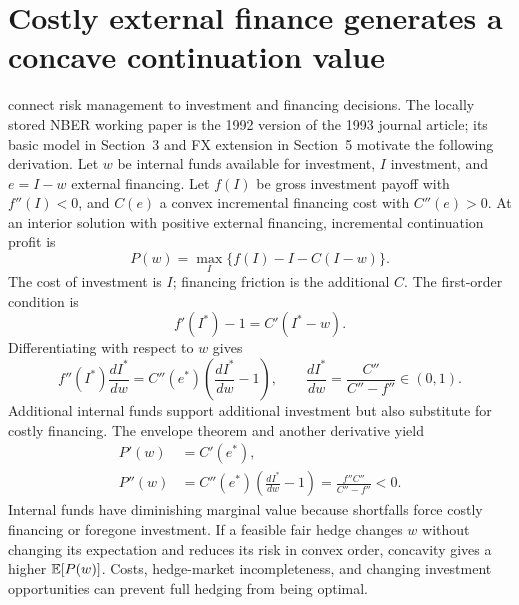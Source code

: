 \section{Costly external finance generates a concave continuation value}
\label{sec:froot}
\citet{froot1993} connect risk management to investment and financing decisions. The locally stored NBER working paper is the 1992 version of the 1993 journal article; its basic model in Section~3 and FX extension in Section~5 motivate the following derivation. Let $w$ be internal funds available for investment, $I$ investment, and $e=I-w$ external financing. Let $f(I)$ be gross investment payoff with $f''(I)<0$, and $C(e)$ a convex incremental financing cost with $C''(e)>0$. At an interior solution with positive external financing, incremental continuation profit is
\begin{equation}
P(w)=\max_I\{f(I)-I-C(I-w)\}.
\label{eq:frootvalue}
\end{equation}
The cost of investment is $I$; financing friction is the additional $C$. The first-order condition is
\begin{equation}
f'(I^*)-1=C'(I^*-w).
\end{equation}
Differentiating with respect to $w$ gives
\begin{equation}
f''(I^*)\frac{dI^*}{dw}
=C''(e^*)\left(\frac{dI^*}{dw}-1\right),
\qquad
\frac{dI^*}{dw}=\frac{C''}{C''-f''}\in(0,1).
\end{equation}
Additional internal funds support additional investment but also substitute for costly financing. The envelope theorem and another derivative yield
\begin{align}
P'(w)&=C'(e^*),\\
P''(w)&=C''(e^*)\left(\frac{dI^*}{dw}-1\right)
=\frac{f''C''}{C''-f''}<0.
\label{eq:frootcurvature}
\end{align}
Internal funds have diminishing marginal value because shortfalls force costly financing or foregone investment. If a feasible fair hedge changes $w$ without changing its expectation and reduces its risk in convex order, concavity gives a higher $\mathbb E[P(w)]$. Costs, hedge-market incompleteness, and changing investment opportunities can prevent full hedging from being optimal.

